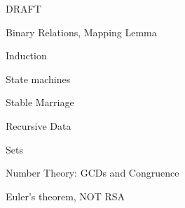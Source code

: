 \documentclass[quiz]{mcs}
\begin{document}


\examspace

\begin{center}
{\Large DRAFT}
\end{center}

\begin{center}
{\large Binary Relations, Mapping Lemma}
\end{center}

\begin{center}
{\large Induction}
\end{center}

\begin{center}
{\large State machines}
\end{center}

\begin{center}
{\large Stable Marriage}
\end{center}

\begin{center}
{\large Recursive Data}
\end{center}

\begin{center}
{\large Sets}
\end{center}

\begin{center}
{\large Number Theory: GCDs and Congruence}
\end{center}

\begin{center}
{\large Euler's theorem, NOT RSA}
\end{center}


\end{document}

